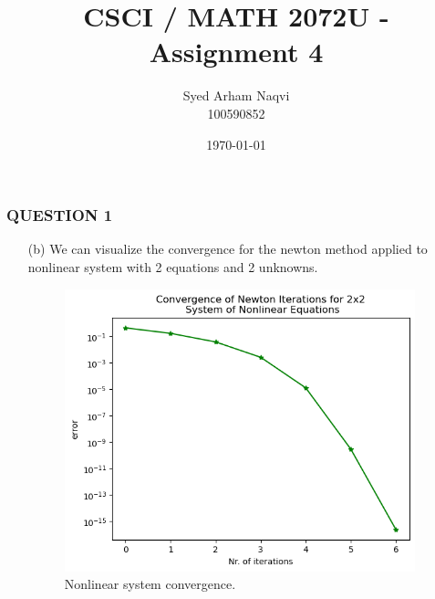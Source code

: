 \documentclass{article}
\title{CSCI / MATH 2072U - Assignment 4}
\author{Syed Arham Naqvi \\ \small{100590852}}
\date{\today}
\begin{document}
\maketitle


\subsubsection*{QUESTION 1}

\vspace{10pt}

\begin{enumerate}

    \item[(b)]  We can visualize the convergence for the newton method applied to nonlinear system with 2 equations and 2 unknowns.
            
                \begin{figure}[h]
                \centering
                \includegraphics[width=4in]{./Quest1b.png}
                \caption{Nonlinear system convergence.}
                \label{fig:image1}
                \end{figure}
    

\end{enumerate}
\end{document}

